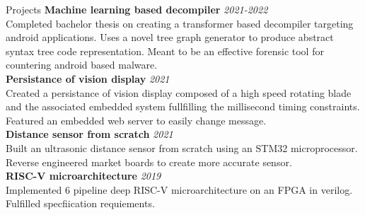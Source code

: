 \documentclass{resume}
\begin{document}
\begin{small}
	\begin{rSection}{Projects}
		{\bf Machine learning based decompiler} \hfill {\em 2021-2022} \\
		Completed bachelor thesis on creating a transformer based decompiler targeting android applications. Uses a novel tree graph generator to produce abstract syntax tree code representation. Meant to be an effective forensic tool for countering android based malware. \\
		{\bf Persistance of vision display} \hfill {\em 2021} \\
		Created a persistance of vision display composed of a high speed rotating blade and the associated embedded system fullfilling the millisecond timing constraints. Featured an embedded web server to easily change message. \\
		{\bf Distance sensor from scratch} \hfill {\em 2021} \\
		Built an ultrasonic distance sensor from scratch using an STM32 microprocessor. Reverse engineered market boards to create more accurate sensor. \\
		{\bf RISC-V microarchitecture} \hfill {\em 2019} \\
		Implemented 6 pipeline deep RISC-V microarchitecture on an FPGA in verilog. Fulfilled specfiication requiements. \\
	\end{rSection}


\end{small}
\end{document}

